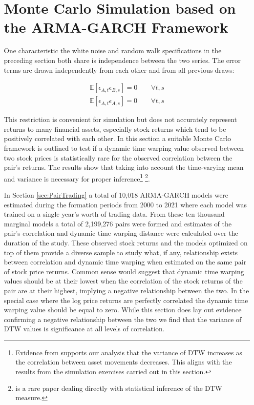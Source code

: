 \documentclass[12pt]{report}
\begin{document}
\section{Monte Carlo Simulation based on the ARMA-GARCH Framework} \label{sec:MC_sim_arma_garch}

One characteristic the white noise and random walk specifications in the preceding section both share is independence between the two series. The error terms are drawn independently from each other and from all previous draws:

\begin{align}
    \mathbb{E}[\epsilon_{A,t}\epsilon_{B,s}] = 0 \quad \quad \forall t,s \\
    \mathbb{E}[\epsilon_{A,t}\epsilon_{A,s}] = 0 \quad \quad \forall t,s
\end{align}

This restriction is convenient for simulation but does not accurately represent returns to many financial assets, especially stock returns which tend to be positively correlated with each other. In this section a suitable Monte Carlo framework is outlined to test if a dynamic time warping value observed between two stock prices is statistically rare for the observed correlation between the pair's returns. The results show that taking into account the time-varying mean and variance is necessary for proper inference\footnote{Evidence from \cite{Ito_Sakemoto_2020} supports our analysis that the variance of DTW increases as the correlation between asset movements decreases. This aligns with the results from the simulation exercises carried out in this section.} \footnote{\cite{DuyTakeuchi2023statistical} is a rare paper dealing directly with statistical inference of the DTW measure.
}.

In Section \ref{sec:PairTrading} a total of 10,018 ARMA-GARCH models were estimated during the formation periods from 2000 to 2021 where each model was trained on a single year's worth of trading data. From these ten thousand marginal models a total of 2,199,276 pairs were formed and estimates of the pair's correlation and dynamic time warping distance were calculated over the duration of the study. These observed stock returns and the models optimized on top of them provide a diverse sample to study what, if any, relationship exists between correlation and dynamic time warping when estimated on the same pair of stock price returns. Common sense would suggest that dynamic time warping values should be at their lowest when the correlation of the stock returns of the pair are at their highest, implying a negative relationship between the two. In the special case where the log price returns are perfectly correlated the dynamic time warping value should be equal to zero. While this section does lay out evidence confirming a negative relationship between the two we find that the variance of DTW values is significance at all levels of correlation. 
\end{document}
